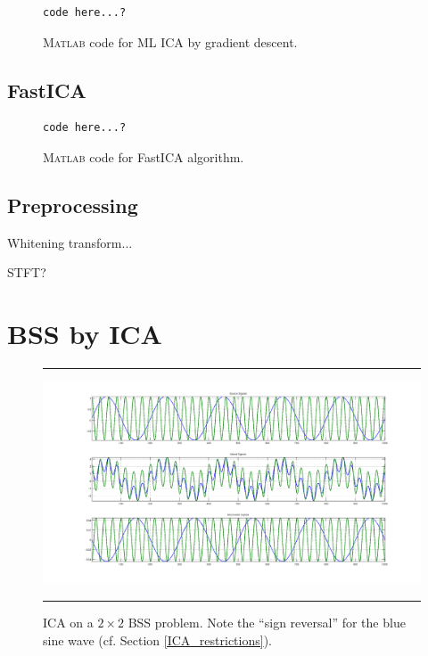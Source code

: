 \documentclass[11pt, oneside, a4paper]{report}
\begin{document}
\begin{figure}[!htpb]
  \begin{lstlisting}[frame=single]
    code here...?
  \end{lstlisting}
  \caption{\textsc{Matlab} code for ML ICA by gradient descent.}
  \label{mlica_code}
\end{figure}


\subsection{FastICA}\label{fastICA}

\begin{figure}[!htpb]
  \begin{lstlisting}[frame=single]
    code here...?
  \end{lstlisting}
  \caption{\textsc{Matlab} code for FastICA algorithm.}
  \label{mlica_code}
\end{figure}


\subsection{Preprocessing}\label{ica_preprocessing}

Whitening transform...

STFT?

\section{BSS by ICA}\label{BSS_ICA}


\begin{figure}
  \centering
  \hrule
  \includegraphics[width = .9\textwidth]{Figures/ica_simple}
  \hrule
  \caption{ICA on a $2\times 2$ BSS problem. Note the ``sign reversal'' for the blue sine wave (cf. Section \ref{ICA_restrictions}).}
\end{figure}
\end{document}
